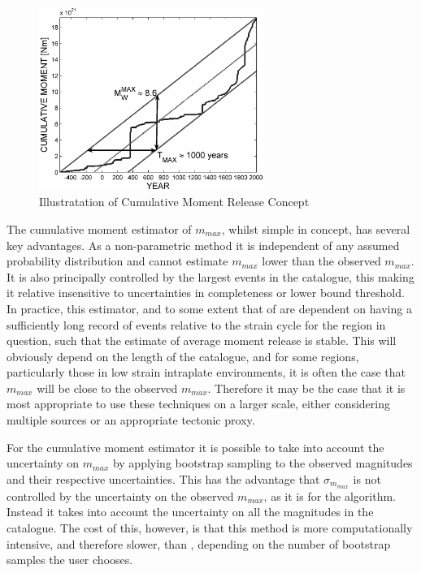 \begin{figure}[htb]
	\centering
		\includegraphics[height=6cm, keepaspectratio=true]{./figures/Cumulative_Moment.eps}
	\caption{Illustratation of Cumulative Moment Release Concept}
	\label{fig:Cumulative_Moment}
\end{figure}

The cumulative moment estimator of $m_{max}$, whilst simple in concept, has several key advantages. As a non-parametric method it is independent of any assumed probability distribution and cannot estimate $m_{max}$ lower than the observed $m_{max}$. It is also principally controlled by the largest events in the catalogue, this making it relative insensitive to uncertainties in completeness or lower bound threshold. In practice, this estimator, and to some extent that of \cite{Kijko2004} are dependent on having a sufficiently long record of events relative to the strain cycle for the region in question, such that the estimate of average moment release is stable. This will obviously depend on the length of the catalogue, and for some regions, particularly those in low strain intraplate environments, it is often the case that $m_{max}$ will be close to the observed $m_{max}$. Therefore it may be the case that it is most appropriate to use these techniques on a larger scale, either considering multiple sources or an appropriate tectonic proxy.

For the cumulative moment estimator it is possible to take into account the uncertainty on $m_{max}$ by applying bootstrap sampling to the observed magnitudes and their respective uncertainties. This has the advantage that $\sigma_{m_{max}}$ is not controlled by the uncertainty on the observed $m_{max}$, as it is for the \cite{Kijko2004} algorithm. Instead it takes into account the uncertainty on all the magnitudes in the catalogue. The cost of this, however, is that this method is more computationally intensive, and therefore slower, than \cite{Kijko2004}, depending on the number of bootstrap samples the user chooses.

